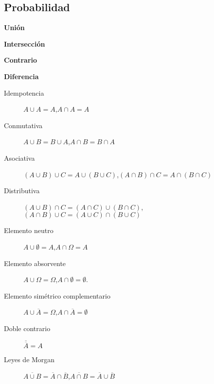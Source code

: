 \begin{multicols*}{2}
\newpage

\subsection*{Probabilidad}

\begin{tcolorbox}[hbox, title=Operaciones de sucesos]
\begin{minipage}{0.4\textwidth}
\textbf{Unión}
\begin{center}

\end{center}
\textbf{Intersección}
\begin{center}

\end{center}
\textbf{Contrario}
\begin{center}

\end{center}
\textbf{Diferencia}
\begin{center}

\end{center}
\end{minipage}
\end{tcolorbox}

\begin{tcolorbox}[hbox, title=Álgebra de sucesos]
\begin{minipage}{0.4\textwidth}
\begin{description}
\item[Idempotencia] $A\cup A=A$,\quad $A\cap A=A$
\item[Conmutativa] $A\cup B=B\cup A$,\quad $A\cap B = B\cap A$
\item[Asociativa] $(A\cup B)\cup C = A\cup (B\cup C)$,\quad $(A\cap B)\cap C = A\cap (B\cap C)$
\item[Distributiva] $(A\cup B)\cap C = (A\cap C)\cup (B\cap C)$,\quad $(A\cap B)\cup C = (A\cup C)\cap (B\cup C)$
\item[Elemento neutro] $A\cup \emptyset=A$,\quad $A\cap \Omega=A$
\item[Elemento absorvente] $A\cup \Omega=\Omega$,\quad $A\cap \emptyset=\emptyset$.
\item[Elemento simétrico complementario] $A\cup \overline A = \Omega$,\quad $A\cap \overline A= \emptyset$
\item[Doble contrario] $\overline{\overline A} = A$
\item[Leyes de Morgan] $\overline{A\cup B} = \overline A\cap \overline B$,\quad $\overline{A\cap B} = \overline A\cup \overline B$
\end{description}
\end{minipage}
\end{tcolorbox}


\end{multicols*}

